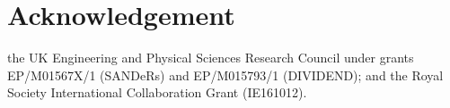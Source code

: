 \section*{Acknowledgement}
the UK Engineering and Physical Sciences Research Council under
grants EP/M01567X/1 (SANDeRs) and EP/M015793/1 (DIVIDEND);
and the Royal Society International Collaboration Grant (IE161012). 